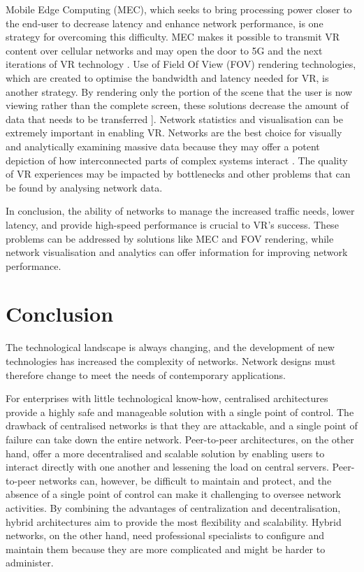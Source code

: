 Mobile Edge Computing (MEC), which seeks to bring processing power closer to the end-user to decrease latency and enhance network performance, is one strategy for overcoming this difficulty. MEC makes it possible to transmit VR content over cellular networks and may open the door to 5G and the next iterations of VR technology \cite{fovedge}\cite{Zhang2017}. Use of Field Of View (FOV) rendering technologies, which are created to optimise the bandwidth and latency needed for VR, is another strategy. By rendering only the portion of the scene that the user is now viewing rather than the complete screen, these solutions decrease the amount of data that needs to be transferred \cite{fovedge}].
Network statistics and visualisation can be extremely important in enabling VR. Networks are the best choice for visually and analytically examining massive data because they may offer a potent depiction of how interconnected parts of complex systems interact \cite{fovedge}. The quality of VR experiences may be impacted by bottlenecks and other problems that can be found by analysing network data.

In conclusion, the ability of networks to manage the increased traffic needs, lower latency, and provide high-speed performance is crucial to VR's success. These problems can be addressed by solutions like MEC and FOV rendering, while network visualisation and analytics can offer information for improving network performance.

\section{Conclusion}
The technological landscape is always changing, and the development of new technologies has increased the complexity of networks. Network designs must therefore change to meet the needs of contemporary applications.

For enterprises with little technological know-how, centralised architectures provide a highly safe and manageable solution with a single point of control. The drawback of centralised networks is that they are attackable, and a single point of failure can take down the entire network.
Peer-to-peer architectures, on the other hand, offer a more decentralised and scalable solution by enabling users to interact directly with one another and lessening the load on central servers. Peer-to-peer networks can, however, be difficult to maintain and protect, and the absence of a single point of control can make it challenging to oversee network activities.
By combining the advantages of centralization and decentralisation, hybrid architectures aim to provide the most flexibility and scalability. Hybrid networks, on the other hand, need professional specialists to configure and maintain them because they are more complicated and might be harder to administer.

